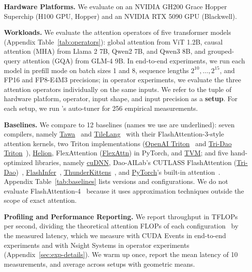 \textbf{Hardware Platforms.}
We evaluate \NAME{} on an NVIDIA GH200 Grace Hopper Superchip (H100 GPU, Hopper)
and an NVIDIA RTX 5090 GPU (Blackwell).

\textbf{Workloads.}
We evaluate the attention operators of five transformer models
(Appendix Table~\ref{tab:operators}):
global attention from ViT 1.2B, causal attention (MHA) from Llama 2 7B, Qwen2 7B, and Qwen3 8B,
and grouped-query attention (GQA) from GLM-4 9B.
In end-to-end experiments, we run each model in prefill mode
on batch sizes 1 and 8, sequence lengths $2^{10}, \dots, 2^{15}$,
and FP16 and FP8-E4M3 precisions;
in operator experiments, we evaluate the three attention operators individually
on the same inputs.
We refer to the tuple of hardware platform, operator, input shape, and input precision as
a \textbf{setup}.
For each setup, we run \NAME{}'s auto-tuner for 256 empirical measurements.

\textbf{Baselines.}
We compare \NAME{} to 12 baselines (names we use are underlined):
seven compilers, namely \uline{Tawa}~\cite{tawa} and \uline{TileLang}~\cite{tilelang}
with their FlashAttention-3-style attention kernels,
two Triton implementations (\uline{OpenAI Triton}~\cite{openai-fused-attn}
and \uline{Tri-Dao Triton}~\cite{flash-attn-repo}), \uline{Helion},
FlexAttention (\uline{FlexAttn}) in PyTorch, and \uline{TVM};
and five hand-optimized libraries, namely \uline{cuDNN},
Dao-AILab's CUTLASS FlashAttention (\uline{Tri-Dao})~\cite{flash-attn-repo},
\uline{FlashInfer}~\cite{flashinfer}, \uline{ThunderKittens}~\cite{thunderkittens},
and \uline{PyTorch}'s built-in attention~\cite{pytorch}.
Appendix Table~\ref{tab:baselines} lists versions and configurations.
We do not evaluate FlashAttention-4~\cite{zadouri2026flashattention4algorithmkernelpipelining}
because it uses approximation techniques outside the scope of exact attention.

\textbf{Profiling and Performance Reporting.}
We report throughput in TFLOPs per second, dividing the theoretical attention FLOPs
of each configuration~\cite{Megatron-LM} by the measured latency,
which we measure with CUDA Events in end-to-end experiments
and with Nsight Systems in operator experiments (Appendix~\ref{sec:exp-details}).
We warm up once, report the mean latency of 10 measurements,
and average across setups with geometric means.

